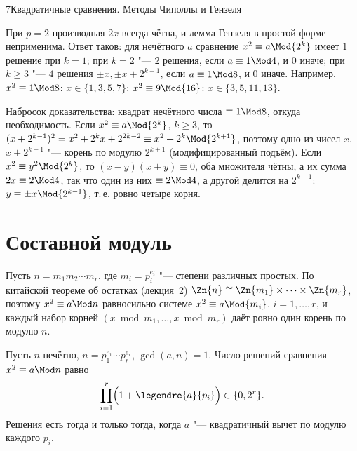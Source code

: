 \begin{lecture}{7}{Квадратичные сравнения. Методы Чиполлы и Гензеля}
\begin{remark}[модуль $2^k$]\label{l7:two}
При $p = 2$ производная $2x$ всегда чётна, и лемма Гензеля в простой форме неприменима. Ответ
таков: для нечётного $a$ сравнение $x^2 \equiv a \Mod{2^k}$ имеет $1$ решение при $k = 1$;
при $k = 2$ "--- $2$ решения, если $a \equiv 1 \Mod 4$, и $0$ иначе; при $k \ge 3$ "--- $4$ решения
$\pm x, \pm x + 2^{k-1}$, если $a \equiv 1 \Mod 8$, и $0$ иначе. Например, $x^2 \equiv 1 \Mod 8$:
$x \in \{1, 3, 5, 7\}$; $x^2 \equiv 9 \Mod{16}$: $x \in \{3, 5, 11, 13\}$.

Набросок доказательства: квадрат нечётного числа $\equiv 1 \Mod 8$, откуда необходимость. Если
$x^2 \equiv a \Mod{2^k}$, $k \ge 3$, то $(x + 2^{k-1})^2 = x^2 + 2^k x + 2^{2k-2} \equiv x^2 + 2^k
\Mod{2^{k+1}}$, поэтому одно из чисел $x$, $x + 2^{k-1}$ "--- корень по модулю $2^{k+1}$
(модифицированный подъём). Если $x^2 \equiv y^2 \Mod{2^k}$, то $(x - y)(x + y) \equiv 0$, оба
множителя чётны, а их сумма $2x \equiv 2 \Mod 4$, так что один из них $\equiv 2 \Mod 4$, а другой
делится на $2^{k-1}$: $y \equiv \pm x \Mod{2^{k-1}}$, т.\,е. ровно четыре корня.
\end{remark}



\section{Составной модуль}\label{l7:sec-composite}

Пусть $n = m_1 m_2 \cdots m_r$, где $m_i = p_i^{e_i}$ "--- степени различных простых. По китайской
теореме об остатках (лекция~2) $\Zn{n} \cong \Zn{m_1} \times \cdots \times
\Zn{m_r}$, поэтому $x^2 \equiv a \Mod n$ равносильно системе $x^2 \equiv a \Mod{m_i}$,
$i = 1, \dots, r$, и каждый набор корней $(x \bmod m_1, \dots, x \bmod m_r)$ даёт ровно один корень
по модулю $n$.

\begin{theorem}\label{l7:crt-count}
Пусть $n$ нечётно, $n = p_1^{e_1} \cdots p_r^{e_r}$, $\gcd(a, n) = 1$. Число решений сравнения
$x^2 \equiv a \Mod n$ равно
\[
  \prod_{i=1}^{r} \Bigl(1 + \legendre{a}{p_i}\Bigr) \in \{0, 2^r\}.
\]
Решения есть тогда и только тогда, когда $a$ "--- квадратичный вычет по модулю каждого $p_i$.
\end{theorem}


\end{lecture}
